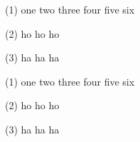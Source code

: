 (1) one two three
four five six

(2) ho ho ho

(3) ha ha ha



(1) one two three
four five six

(2) ho ho ho

(3) ha ha ha



